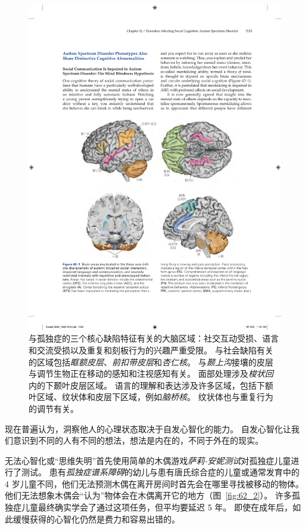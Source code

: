 \begin{figure}[htbp]
	\centering
	\includegraphics[width=0.95\linewidth]{chap62/fig_62_1}
	\caption{与孤独症的三个核心缺陷特征有关的大脑区域：社交互动受损、语言和交流受损以及重复和刻板行为的兴趣严重受限。
		与社会缺陷有关的区域包括\textit{眶额皮层}、\textit{前扣带皮层}和\textit{杏仁核}。
		与\textit{颞上沟}接壤的皮层与调节生物正在移动的感知和注视感知有关。
		面部处理涉及\textit{梭状回}内的下颞叶皮层区域。
		语言的理解和表达涉及许多区域，包括下额叶区域、纹状体和皮层下区域，例如\textit{脑桥核}。
		纹状体也与重复行为的调节有关。}
	\label{fig:62_1}
\end{figure}


现在普遍认为，洞察他人的心理状态取决于自发心智化的能力。
自发心智化让我们意识到不同的人有不同的想法，想法是内在的，不同于外在的现实。


无法心智化或“思维失明”首先使用简单的木偶游戏\textit{萨莉-安妮测试}对孤独症儿童进行了测试。
患有\textit{孤独症谱系障碍}的幼儿与患有唐氏综合症的儿童或通常发育中的 4 岁儿童不同，他们无法预测木偶在离开房间时首先会在哪里寻找被移动的物体。
他们无法想象木偶会“认为”物体会在木偶离开它的地方（图~\ref{fig:62_2}）。
许多孤独症儿童最终确实学会了通过这项任务，但平均要延迟 5 年。
即使在成年后，如此缓慢获得的心智化仍然是费力和容易出错的。


